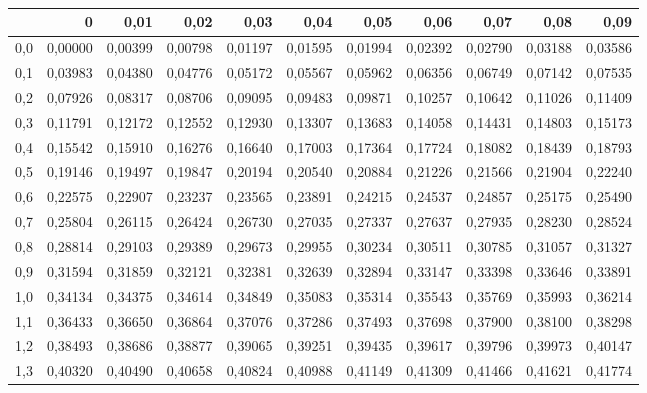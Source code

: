 \documentclass[14pt,aspectratio=1610]{beamer}
\begin{document}
\begin{frame}[fragile]{}
\frametitle{}
\begin{block}{}
\begin{center}
\small\addtolength{\tabcolsep}{-3pt}
{\footnotesize
\begin{tabular}{rrrrrrrrrrr}
  \hline
 & 0 & 0,01 & 0,02 & 0,03 & 0,04 & 0,05 & 0,06 & 0,07 & 0,08 & 0,09 \\ 
  \hline
0,0 & 0,00000 & 0,00399 & 0,00798 & 0,01197 & 0,01595 & 0,01994 & 0,02392 & 0,02790 & 0,03188 & 0,03586 \\ 
  0,1 & 0,03983 & 0,04380 & 0,04776 & 0,05172 & 0,05567 & 0,05962 & 0,06356 & 0,06749 & 0,07142 & 0,07535 \\ 
  0,2 & 0,07926 & 0,08317 & 0,08706 & 0,09095 & 0,09483 & 0,09871 & 0,10257 & 0,10642 & 0,11026 & 0,11409 \\ 
  0,3 & 0,11791 & 0,12172 & 0,12552 & 0,12930 & 0,13307 & 0,13683 & 0,14058 & 0,14431 & 0,14803 & 0,15173 \\ 
  0,4 & 0,15542 & 0,15910 & 0,16276 & 0,16640 & 0,17003 & 0,17364 & 0,17724 & 0,18082 & 0,18439 & 0,18793 \\ 
  0,5 & 0,19146 & 0,19497 & 0,19847 & 0,20194 & 0,20540 & 0,20884 & 0,21226 & 0,21566 & 0,21904 & 0,22240 \\ 
  0,6 & 0,22575 & 0,22907 & 0,23237 & 0,23565 & 0,23891 & 0,24215 & 0,24537 & 0,24857 & 0,25175 & 0,25490 \\ 
  0,7 & 0,25804 & 0,26115 & 0,26424 & 0,26730 & 0,27035 & 0,27337 & 0,27637 & 0,27935 & 0,28230 & 0,28524 \\ 
  0,8 & 0,28814 & 0,29103 & 0,29389 & 0,29673 & 0,29955 & 0,30234 & 0,30511 & 0,30785 & 0,31057 & 0,31327 \\ 
  0,9 & 0,31594 & 0,31859 & 0,32121 & 0,32381 & 0,32639 & 0,32894 & 0,33147 & 0,33398 & 0,33646 & 0,33891 \\ 
  1,0 & 0,34134 & 0,34375 & 0,34614 & 0,34849 & 0,35083 & 0,35314 & 0,35543 & 0,35769 & 0,35993 & 0,36214 \\ 
  1,1 & 0,36433 & 0,36650 & 0,36864 & 0,37076 & 0,37286 & 0,37493 & 0,37698 & 0,37900 & 0,38100 & 0,38298 \\ 
  1,2 & 0,38493 & 0,38686 & 0,38877 & 0,39065 & 0,39251 & 0,39435 & 0,39617 & 0,39796 & 0,39973 & 0,40147 \\ 
  1,3 & 0,40320 & 0,40490 & 0,40658 & 0,40824 & 0,40988 & 0,41149 & 0,41309 & 0,41466 & 0,41621 & 0,41774 \\ 

\end{tabular}}
\end{center}
\end{block}
\end{frame}
\end{document}
